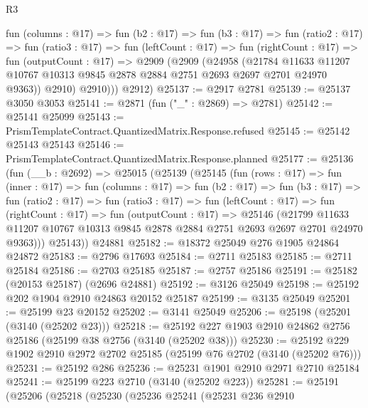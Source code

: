 \begin{lexlean}{R3}
\begin{coremodule}
          fun (columns : @17) =>
          fun (b2 : @17) =>
          fun (b3 : @17) =>
          fun (ratio2 : @17) =>
          fun (ratio3 : @17) =>
          fun (leftCount : @17) =>
          fun (rightCount : @17) =>
          fun (outputCount : @17) =>
          @2909
            (@2909
              (@24958
                (@21784
                  @11633
                  @11207
                  @10767
                  @10313
                  @9845
                  @2878
                  @2884
                  @2751
                  @2693
                  @2697
                  @2701
                  @24970
                  @9363))
              @2910)
            @2910)))
      @2912)
@25137 := @2917 @2781
@25139 := @25137 @3050 @3053
@25141 := @2871 (fun ("_" : @2869) => @2781)
@25142 := @25141 @25099
@25143 := PrismTemplateContract.QuantizedMatrix.Response.refused
@25145 := @25142 @25143 @25143
@25146 := PrismTemplateContract.QuantizedMatrix.Response.planned
@25177 := @25136
    (fun (__b : @2692) =>
    @25015
      (@25139
        (@25145
          (fun (rows : @17) =>
          fun (inner : @17) =>
          fun (columns : @17) =>
          fun (b2 : @17) =>
          fun (b3 : @17) =>
          fun (ratio2 : @17) =>
          fun (ratio3 : @17) =>
          fun (leftCount : @17) =>
          fun (rightCount : @17) =>
          fun (outputCount : @17) =>
          @25146
            (@21799
              @11633
              @11207
              @10767
              @10313
              @9845
              @2878
              @2884
              @2751
              @2693
              @2697
              @2701
              @24970
              @9363)))
        @25143))
    @24881
@25182 := @18372 @25049 @276 @1905 @24864 @24872
@25183 := @2796 @17693
@25184 := @2711 @25183
@25185 := @2711 @25184
@25186 := @2703 @25185
@25187 := @2757 @25186
@25191 := @25182 (@20153 @25187) (@2696 @24881)
@25192 := @3126 @25049
@25198 := @25192 @202 @1904 @2910 @24863 @20152 @25187
@25199 := @3135 @25049
@25201 := @25199 @23 @20152
@25202 := @3141 @25049
@25206 := @25198 (@25201 (@3140 (@25202 @23)))
@25218 := @25192 @227 @1903 @2910 @24862 @2756 @25186 (@25199 @38 @2756 (@3140 (@25202 @38)))
@25230 := @25192 @229 @1902 @2910 @2972 @2702 @25185 (@25199 @76 @2702 (@3140 (@25202 @76)))
@25231 := @25192 @286
@25236 := @25231 @1901 @2910 @2971 @2710 @25184
@25241 := @25199 @223 @2710 (@3140 (@25202 @223))
@25281 := @25191
    (@25206
      (@25218
        (@25230
          (@25236
            @25241
            (@25231
              @236
              @2910

\end{coremodule}
\end{lexlean}
